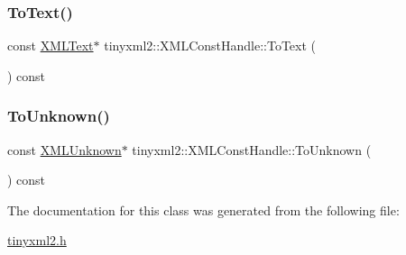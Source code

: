 \mbox{\label{classtinyxml2_1_1_x_m_l_const_handle_a80e24d90d476005aa35602a665358e2d}} 
\subsubsection{\texorpdfstring{To\+Text()}{ToText()}}
{\footnotesize\ttfamily const \hyperlink{classtinyxml2_1_1_x_m_l_text}{X\+M\+L\+Text}$\ast$ tinyxml2\+::\+X\+M\+L\+Const\+Handle\+::\+To\+Text (\begin{DoxyParamCaption}{ }\end{DoxyParamCaption}) const\hspace{0.3cm}{\ttfamily [inline]}}

\mbox{\label{classtinyxml2_1_1_x_m_l_const_handle_a4395e5feaba7b456a81ca274880ea3d3}} 
\subsubsection{\texorpdfstring{To\+Unknown()}{ToUnknown()}}
{\footnotesize\ttfamily const \hyperlink{classtinyxml2_1_1_x_m_l_unknown}{X\+M\+L\+Unknown}$\ast$ tinyxml2\+::\+X\+M\+L\+Const\+Handle\+::\+To\+Unknown (\begin{DoxyParamCaption}{ }\end{DoxyParamCaption}) const\hspace{0.3cm}{\ttfamily [inline]}}



The documentation for this class was generated from the following file\+:\begin{DoxyCompactItemize}
\item 
\hyperlink{tinyxml2_8h}{tinyxml2.\+h}\end{DoxyCompactItemize}
